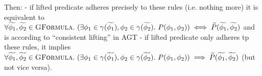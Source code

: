 
Then:
- if lifted predicate adheres precisely to these rules (i.e. nothing more) it is equivalent to 
    $\forall \widetilde{\phi_1}, \widetilde{\phi_2} \in \textsc{GFormula}.~ (\exists \phi_1 \in \gamma(\widetilde{\phi_1}), \phi_2 \in \gamma(\widetilde{\phi_2}).~ P(\phi_1, \phi_2)) \iff \widetilde{P}(\widetilde{\phi_1}, \widetilde{\phi_2})$
  and is according to “consistent lifting” in AGT
- if lifted predicate only adheres tp these rules, it implies 
    $\forall \widetilde{\phi_1}, \widetilde{\phi_2} \in \textsc{GFormula}.~ (\exists \phi_1 \in \gamma(\widetilde{\phi_1}), \phi_2 \in \gamma(\widetilde{\phi_2}).~ P(\phi_1, \phi_2)) \implies \widetilde{P}(\widetilde{\phi_1}, \widetilde{\phi_2})$ (but not vice versa).

